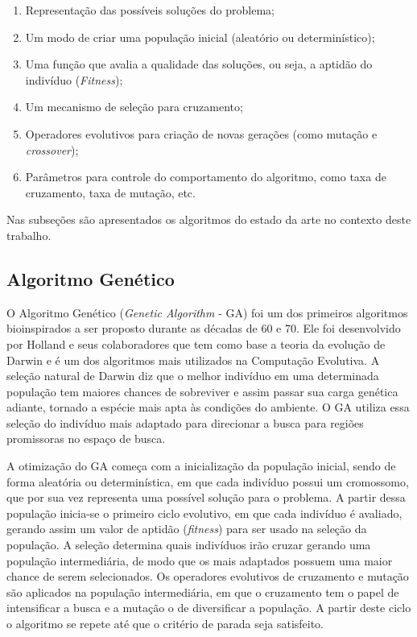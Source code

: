 \begin{enumerate}
\item Representação das possíveis soluções do problema;
\item Um modo de criar uma população inicial (aleatório ou determinístico);
\item Uma função que avalia a qualidade das soluções, ou seja, a aptidão do indivíduo (\textit{Fitness});
\item Um mecanismo de seleção para cruzamento;
\item Operadores evolutivos para criação de novas gerações (como mutação e \textit{crossover});
\item Parâmetros para controle do comportamento do algoritmo, como taxa de cruzamento, taxa de mutação, etc.
\end{enumerate}

Nas subseções são apresentados os algoritmos do estado da arte no contexto deste trabalho.

\subsection{Algoritmo Genético}
\label{sec:genetic_algorithms}
O Algoritmo Genético (\textit{Genetic Algorithm} - GA) foi um dos primeiros algoritmos bioinspirados a ser proposto durante as décadas de 60 e 70. Ele foi desenvolvido por Holland e seus colaboradores que tem como base a teoria da evolução de Darwin \cite{ga} e é um dos algoritmos mais utilizados na Computação Evolutiva. A seleção natural de Darwin diz que o melhor indivíduo em uma determinada população tem maiores chances de sobreviver e assim passar sua carga genética adiante, tornado a espécie mais apta às condições do ambiente. O GA utiliza essa seleção do indivíduo mais adaptado para direcionar a busca para regiões promissoras no espaço de busca.

A otimização do GA começa com a inicialização da população inicial, sendo de forma aleatória ou determinística, em que cada indivíduo possui um cromossomo, que por sua vez representa uma possível solução para o problema. A partir dessa população inicia-se o primeiro ciclo evolutivo, em que cada indivíduo é avaliado, gerando assim um valor de aptidão (\textit{fitness}) para ser usado na seleção da população. A seleção determina quais indivíduos irão cruzar gerando uma população intermediária, de modo que os mais adaptados possuem uma maior chance de serem selecionados. Os operadores evolutivos de cruzamento e mutação são aplicados na população intermediária, em que o cruzamento tem o papel de intensificar a busca e a mutação o de diversificar a população. A partir deste ciclo o algoritmo se repete até que o critério de parada seja satisfeito.

